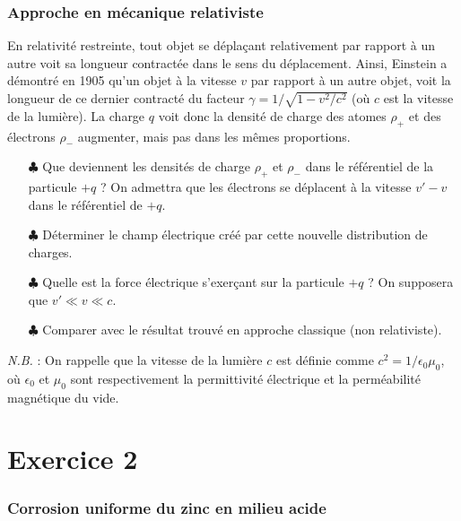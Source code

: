 \documentclass{report}
\begin{document}
\subsubsection*{Approche en mécanique relativiste}

En relativité restreinte, tout objet se déplaçant relativement par rapport à un autre voit sa longueur contractée dans le sens du déplacement. Ainsi, Einstein a démontré en 1905 qu'un objet à la vitesse $v$ par rapport à un autre objet, voit la longueur de ce dernier contracté du facteur $\gamma=1/\sqrt{1-v^{2}/c^{2}}$ (où $c$ est la vitesse de la lumière). La charge $q$ voit donc la densité de charge des atomes $\rho_+$ et des électrons $\rho_-$ augmenter, mais pas dans les mêmes proportions. 
	\begin{itemize}
		\item[$\clubsuit$] Que deviennent les densités de charge $\rho_{+}$ et $\rho_{-}$ dans le référentiel de la particule $+q$ ? On admettra que les électrons se déplacent à la vitesse $v'-v$ dans le référentiel de $+q$. 
		\item[$\clubsuit$] Déterminer le champ électrique créé par cette nouvelle distribution de charges. 
		\item[$\clubsuit$] Quelle est la force électrique s'exerçant sur la particule $+q$ ? On supposera que $v'\ll v\ll c$.
		\item[$\clubsuit$] Comparer avec le résultat trouvé en approche classique (non relativiste).
	\end{itemize}
			
\textit{N.B.} : On rappelle que la vitesse de la lumière $c$ est définie comme $c^{2}=1/\epsilon_{0}\mu_{0}$, où $\epsilon_{0}$ et $\mu_{0}$ sont respectivement la permittivité électrique et la perméabilité magnétique du vide.

\newpage

\section*{Exercice 2}

\subsubsection*{Corrosion uniforme du zinc en milieu acide}
\end{document}
